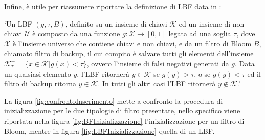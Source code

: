 \documentclass[../../main.tex]{subfiles}
\begin{document}
    Infine, è utile per riassumere riportare la definizione di LBF data in \cite{10.5555/3326943.3326986}: 

    `Un LBF $(g, \tau, B)$, definito su un insieme di chiavi $\mathcal{K}$ ed un insieme di non-chiavi $\mathcal{U}$ è composto da una funzione $g : \mathcal{X} \rightarrow [0,1]$ legata ad una soglia $\tau$, dove $\mathcal{X}$ è l'insieme universo che contiene chiavi e non chiavi, e da un filtro di Bloom $B$, chiamato filtro di backup, il cui compito è salvare tutti gli elementi dell'insieme $\mathcal{K}_{\tau}^- = \{x \in \mathcal{K} | g(x) < \tau\}$, ovvero l'insieme di falsi negativi generati da $g$. Data un qualsiasi elemento $y$, l'LBF ritornerà $y \in \mathcal{K}$ se $g(y) > \tau$, o se $g(y) < \tau$ ed il filtro di backup ritorna $y \in \mathcal{K}$. In tutti gli altri casi l'LBF ritornerà $y \notin \mathcal{K}$.'

    La figura \ref{fig:confrontoInserimento} mette a confronto la procedura di inizializzazione per le due tipologie di filtro presentate, nello specifico viene riportata nella figura \ref{fig:BFInizializzazione} l'inizializzazione per un filtro di Bloom, mentre in figura \ref{fig:LBFInizializzazione} quella di un LBF.
    
\end{document}
